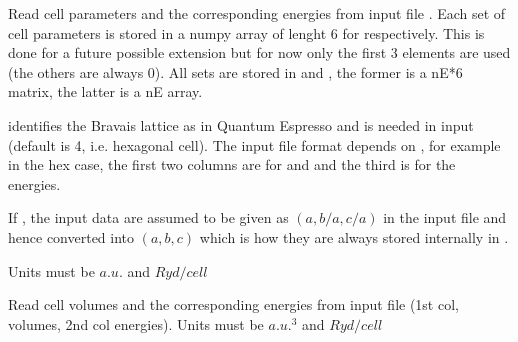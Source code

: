 \documentclass[letterpaper,10pt,english]{sphinxmanual}
\begin{document}
\begin{fulllineitems}
\label{pyqha:pyqha.read.read_Etot}
Read cell parameters  and the corresponding energies from input file . 
Each set of cell parameters is stored in a numpy array of lenght 6 
for  respectively. This is done for a future possible 
extension but for now only the first 3 elements are used (the others are always 0).
All sets are stored in  and , the former is a nE*6 matrix, 
the latter is a nE array.

 identifies the Bravais lattice as in Quantum Espresso and is needed 
in input (default is 4, i.e. hexagonal cell). The input file format depends
on , for example in the hex case, the first two columns are for  and
 and the third is for the energies.

If , the input data are assumed to be given as 
\((a,b/a,c/a)\) in the input file and hence converted into \((a,b,c)\)
which is how they are always stored internally in .

Units must be \(a.u.\) and \(Ryd/cell\)

\end{fulllineitems}


\begin{fulllineitems}
\label{pyqha:pyqha.read.read_EtotV}
Read cell volumes and the corresponding energies from input file 
(1st col, volumes, 2nd col energies). Units must be \(a.u.^3\) and 
\(Ryd/cell\)

\end{fulllineitems}


\begin{fulllineitems}
\label{pyqha:pyqha.read.read_alpha}
\end{fulllineitems}
\end{document}
